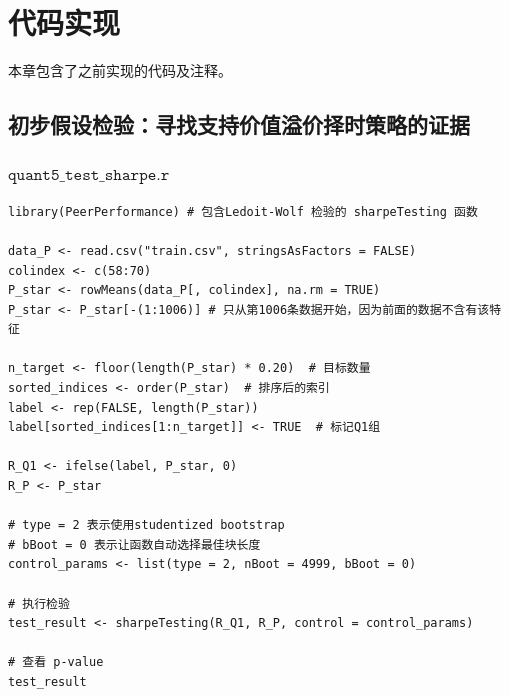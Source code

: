 \documentclass[11pt, a4paper]{article}
\begin{document}
\section{代码实现}
本章包含了之前实现的代码及注释。
\subsection{初步假设检验：寻找支持价值溢价择时策略的证据}
\subsubsection{$\texttt{quant5\_test\_sharpe.r}$}
\begin{verbatim}
library(PeerPerformance) # 包含Ledoit-Wolf 检验的 sharpeTesting 函数

data_P <- read.csv("train.csv", stringsAsFactors = FALSE)
colindex <- c(58:70)
P_star <- rowMeans(data_P[, colindex], na.rm = TRUE)
P_star <- P_star[-(1:1006)] # 只从第1006条数据开始，因为前面的数据不含有该特征

n_target <- floor(length(P_star) * 0.20)  # 目标数量
sorted_indices <- order(P_star)  # 排序后的索引
label <- rep(FALSE, length(P_star))
label[sorted_indices[1:n_target]] <- TRUE  # 标记Q1组

R_Q1 <- ifelse(label, P_star, 0)
R_P <- P_star

# type = 2 表示使用studentized bootstrap 
# bBoot = 0 表示让函数自动选择最佳块长度
control_params <- list(type = 2, nBoot = 4999, bBoot = 0)

# 执行检验
test_result <- sharpeTesting(R_Q1, R_P, control = control_params)

# 查看 p-value
test_result    
\end{verbatim}
\end{document}
